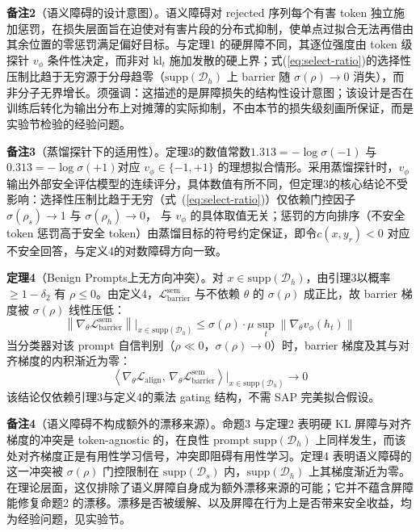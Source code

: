 \documentclass[lettersize,journal]{IEEEtran}
\begin{document}
\textbf{备注2}（语义障碍的设计意图）。语义障碍对 rejected 序列每个有害 token 独立施加惩罚，在损失层面旨在迫使对有害片段的分布式抑制，使单点过拟合无法再借由其余位置的零惩罚满足偏好目标。与定理1 的硬屏障不同，其逐位强度由 token 级探针 $v_\phi$ 条件性决定，而非对 $\mathrm{kl}_t$ 施加发散的硬上界；式(\ref{eq:select-ratio})的选择性压制比趋于无穷源于分母趋零（$\mathrm{supp}(\mathcal{D}_h)$ 上 barrier 随 $\sigma(\rho)\to0$ 消失），而非分子无界增长。须强调：这描述的是屏障损失的结构性设计意图；该设计是否在训练后转化为输出分布上对摊薄的实际抑制，不由本节的损失级刻画所保证，而是实验节检验的经验问题。

\textbf{备注3}（蒸馏探针下的适用性）。定理3的数值常数$1.313 = -\log\sigma(-1)$ 与 $0.313 = -\log\sigma(+1)$对应 $v_\phi \in \{-1,+1\}$ 的理想拟合情形。采用蒸馏探针时，$v_\phi$ 输出外部安全评估模型的连续评分，具体数值有所不同，但定理3的核心结论不受影响：选择性压制比趋于无穷（式~(\ref{eq:select-ratio})）仅依赖门控因子 $\sigma(\rho_s)\to 1$ 与 $\sigma(\rho_h)\to 0$，
与 $v_\phi$ 的具体取值无关；惩罚的方向排序（不安全 token 惩罚高于安全 token）由蒸馏目标的符号约定保证，即令$c(x,y_r)<0$ 对应不安全回答，与定义4的对数障碍方向一致。

\textbf{定理4}（Benign Prompts上无方向冲突）。对 $x \in \mathrm{supp}(\mathcal{D}_h)$，由引理3以概率 $\geq 1-\delta_2$ 有 $\rho \leq 0$。由定义4，$\mathcal{L}^{\text{sem}}_{\text{barrier}}$ 与不依赖 $\theta$ 的 $\sigma(\rho)$ 成正比，故 barrier 梯度被 $\sigma(\rho)$ 线性压低：
\begin{equation}
\left\|\nabla_\theta \mathcal{L}^{\text{sem}}_{\text{barrier}}\right\|\bigg|_{x \in \mathrm{supp}(\mathcal{D}_h)} \leq \sigma(\rho)\cdot \mu\sup_t\|\nabla_\theta v_\phi(h_t)\|
\end{equation}
当分类器对该 prompt 自信判别（$\rho \ll 0$，$\sigma(\rho) \to 0$）时，barrier 梯度及其与对齐梯度的内积渐近为零：
\begin{equation}\label{eq:no-conflict-benign}
\left\langle \nabla_\theta \mathcal{L}_{\text{align}},\, \nabla_\theta \mathcal{L}^{\text{sem}}_{\text{barrier}} \right\rangle\bigg|_{x \in \mathrm{supp}(\mathcal{D}_h)} \to 0
\end{equation}
该结论仅依赖引理3与定义4的乘法 gating 结构，不需 SAP 完美拟合假设。

\textbf{备注4}（语义障碍不构成额外的漂移来源）。命题3 与定理2 表明硬 KL 屏障与对齐梯度的冲突是 token-agnostic 的，在良性 prompt $\mathrm{supp}(\mathcal{D}_h)$ 上同样发生，而该处对齐梯度正是有用性学习信号，冲突即阻碍有用性学习。定理4 表明语义障碍的这一冲突被 $\sigma(\rho)$ 门控限制在 $\mathrm{supp}(\mathcal{D}_s)$ 内，$\mathrm{supp}(\mathcal{D}_h)$ 上其梯度渐近为零。在理论层面，这仅排除了语义屏障自身成为额外漂移来源的可能；它并不蕴含屏障能修复命题2 的漂移。漂移是否被缓解、以及屏障在行为上是否带来安全收益，均为经验问题，见实验节。
\end{document}
